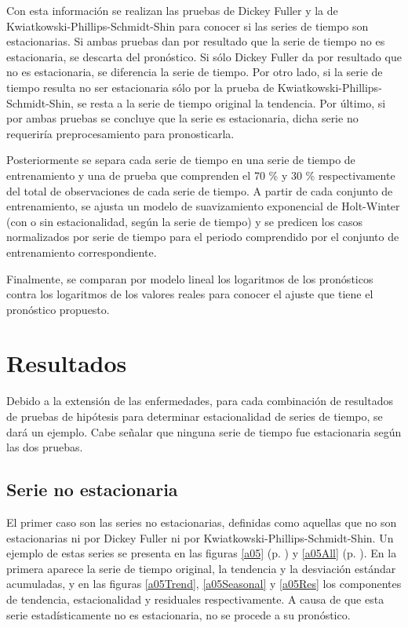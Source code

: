 \documentclass[final,5p,times,twocolumn]{elsarticle}
\begin{document}
Con esta información se realizan las pruebas de Dickey Fuller y la de Kwiatkowski-Phillips-Schmidt-Shin para conocer si las series de tiempo son estacionarias. Si ambas pruebas dan por resultado que la serie de tiempo no es estacionaria, se descarta del pronóstico. Si sólo Dickey Fuller da por resultado que no es estacionaria, se diferencia la serie de tiempo. Por otro lado, si la serie de tiempo resulta no ser estacionaria sólo por la prueba de Kwiatkowski-Phillips-Schmidt-Shin, se resta a la serie de tiempo original la tendencia. Por último, si por ambas pruebas se concluye que la serie es estacionaria, dicha serie no requeriría preprocesamiento para pronosticarla.

Posteriormente se separa cada serie de tiempo en una serie de tiempo de entrenamiento y una de prueba que comprenden el 70 \% y 30 \% respectivamente del total de observaciones de cada serie de tiempo. A partir de cada conjunto de entrenamiento, se ajusta un modelo de suavizamiento exponencial de Holt-Winter (con o sin estacionalidad, según la serie de tiempo) y se predicen los casos normalizados por serie de tiempo para el periodo comprendido por el conjunto de entrenamiento correspondiente.

Finalmente, se comparan por modelo lineal los logaritmos de los pronósticos contra los logaritmos de los valores reales para conocer el ajuste que tiene el pronóstico propuesto.

\section{Resultados}
\label{sec:results}

Debido a la extensión de las enfermedades, para cada combinación de resultados de pruebas de hipótesis para determinar estacionalidad de series de tiempo, se dará un ejemplo. Cabe señalar que ninguna serie de tiempo fue estacionaria según las dos pruebas.

\subsection{Serie no estacionaria}

El primer caso son las series no estacionarias, definidas como aquellas que no son estacionarias ni por Dickey Fuller ni por Kwiatkowski-Phillips-Schmidt-Shin. Un ejemplo de estas series se presenta en las figuras \ref{a05} (p. \pageref{a05}) y \ref{a05All} (p. \pageref{a05All}). En la primera aparece la serie de tiempo original, la tendencia y la desviación estándar acumuladas, y en las figuras \ref{a05Trend}, \ref{a05Seasonal} y \ref{a05Res} los componentes de tendencia, estacionalidad y residuales respectivamente. A causa de que esta serie estadísticamente no es estacionaria, no se procede a su pronóstico.
\end{document}
